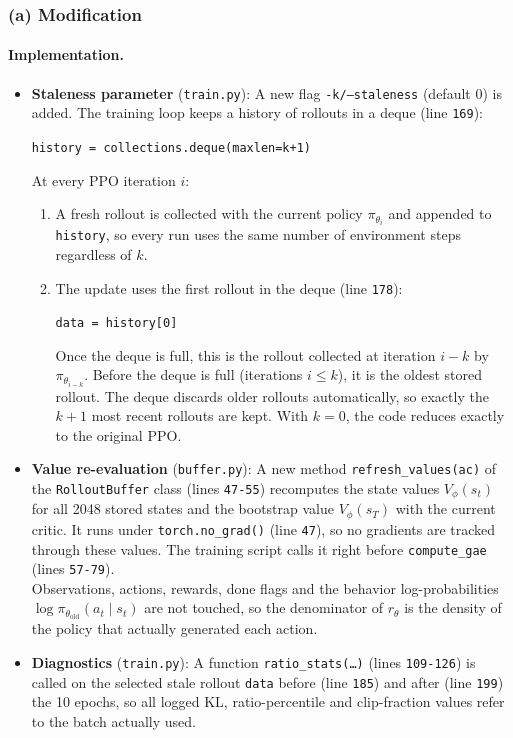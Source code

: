 \documentclass[11pt]{article}
\newcommand{\piold}{\pi_{\theta_{\mathrm{old}}}}
\newcommand{\code}[1]{\texttt{#1}}
\begin{document}
\subsubsection*{(a) Modification}

\paragraph{Implementation.}
\begin{itemize}[leftmargin=*]
  \item \textbf{Staleness parameter} (\code{train.py}): A new flag \code{-k/--staleness}
        (default 0) is added. The training loop keeps a history of rollouts in a deque (line \texttt{169}):
        \begin{center}
          \code{history = collections.deque(maxlen=k+1)}
        \end{center}
        At every PPO iteration $i$:
        \begin{enumerate}[nosep]
          \item A fresh rollout is collected with the current policy $\pi_{\theta_i}$ and appended to
                \code{history}, so every run uses the same number of environment steps regardless of $k$.
          \item The update uses the first rollout in the deque (line \texttt{178}):
                \begin{center}\code{data = history[0]}\end{center}
                Once the deque is full, this is the rollout collected at iteration $i-k$ by $\pi_{\theta_{i-k}}$.
                Before the deque is full (iterations $i\le k$), it is the oldest stored rollout. The deque
                discards older rollouts automatically, so exactly the $k+1$ most recent rollouts are kept.
                With $k=0$, the code reduces exactly to the original PPO.
        \end{enumerate}
  \item \textbf{Value re-evaluation} (\code{buffer.py}): A new method \code{refresh\_values(ac)}
        of the \code{RolloutBuffer} class (lines \texttt{47-55}) recomputes the state values
        $V_\phi(s_t)$ for all 2048 stored states and the bootstrap value $V_\phi(s_T)$ with the
        current critic. It runs under \code{torch.no\_grad()} (line \texttt{47}), so no gradients are
        tracked through these values. The training script calls it right before \code{compute\_gae}
        (lines \texttt{57-79}).\\
        Observations, actions, rewards, done flags and the behavior log-probabilities
        $\log\piold(a_t\mid s_t)$ are not touched, so the denominator of $r_\theta$ is the density of the
        policy that actually generated each action.
  \item \textbf{Diagnostics} (\code{train.py}): A function \code{ratio\_stats(\ldots)} (lines
        \texttt{109-126}) is called on the selected stale rollout \code{data} before (line \texttt{185})
        and after (line \texttt{199}) the 10 epochs, so all logged KL, ratio-percentile and
        clip-fraction values refer to the batch actually used.
\end{itemize}
\end{document}
